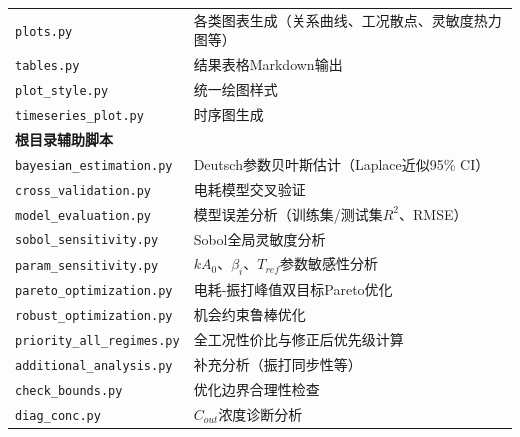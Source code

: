 \begin{table}[H]
\begin{tabularx}{\textwidth}{lX}
    \texttt{plots.py} & 各类图表生成（关系曲线、工况散点、灵敏度热力图等） \\
    \texttt{tables.py} & 结果表格Markdown输出 \\
    \texttt{plot\_style.py} & 统一绘图样式 \\
    \texttt{timeseries\_plot.py} & 时序图生成 \\
    \midrule
    \multicolumn{2}{l}{\textbf{根目录辅助脚本}} \\
    \texttt{bayesian\_estimation.py} & Deutsch参数贝叶斯估计（Laplace近似95\% CI） \\
    \texttt{cross\_validation.py} & 电耗模型交叉验证 \\
    \texttt{model\_evaluation.py} & 模型误差分析（训练集/测试集$R^2$、RMSE） \\
    \texttt{sobol\_sensitivity.py} & Sobol全局灵敏度分析 \\
    \texttt{param\_sensitivity.py} & $kA_0$、$\beta_i$、$T_{ref}$参数敏感性分析 \\
    \texttt{pareto\_optimization.py} & 电耗-振打峰值双目标Pareto优化 \\
    \texttt{robust\_optimization.py} & 机会约束鲁棒优化 \\
    \texttt{priority\_all\_regimes.py} & 全工况性价比与修正后优先级计算 \\
    \texttt{additional\_analysis.py} & 补充分析（振打同步性等） \\
    \texttt{check\_bounds.py} & 优化边界合理性检查 \\
    \texttt{diag\_conc.py} & $C_{out}$浓度诊断分析 \\
    \bottomrule
  \end{tabularx}
\end{table}

